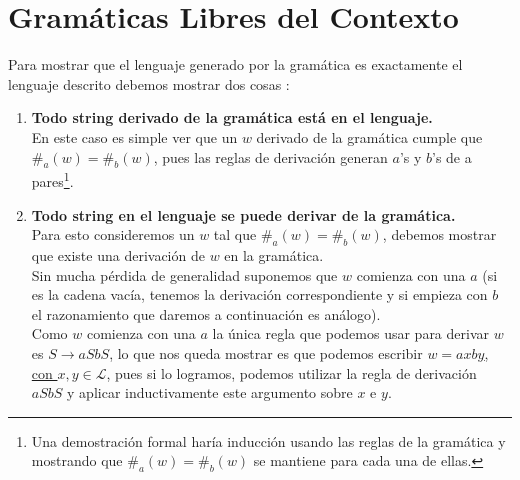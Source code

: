 \documentclass[dcc]{fcfmcourse}
\begin{document}
\section*{Gramáticas Libres del Contexto}
\begin{problems}
\problem
Para mostrar que el lenguaje generado por la gramática es exactamente  el lenguaje descrito debemos mostrar dos cosas :
\begin{enumerate}[1.]
\item \textbf{Todo string derivado de la gramática está en el lenguaje.}\\
En este caso es simple ver que un $w$ derivado de la gramática cumple que $\#_{a}(w)=\#_{b}(w)$, pues las reglas de derivación generan $a$'s y $b$'s de a pares\footnote{Una demostración formal haría inducción usando las reglas de la gramática y mostrando que $\#_{a}(w)=\#_{b}(w)$ se mantiene para cada una de ellas.}.
\item \textbf{Todo string en el lenguaje se puede derivar de la gramática.}\\
Para esto consideremos un $w$ tal que $\#_{a}(w)=\#_{b}(w)$, debemos mostrar que existe una derivación de $w$ en la gramática.\\

Sin mucha pérdida de generalidad suponemos que $w$ comienza con una $a$ (si es la cadena vacía, tenemos la derivación correspondiente y si empieza con $b$ el razonamiento que daremos a continuación es análogo).\\

Como $w$ comienza con una $a$ la única regla que podemos usar para derivar $w$ es $S \rightarrow  aSbS$, lo que nos queda mostrar es que podemos escribir \underline{$w = axby$, con $x, y \in \mathcal{L}$}, pues si lo logramos, podemos utilizar la regla de derivación $aSbS$ y aplicar inductivamente este argumento sobre $x$ e $y$.\\


\end{enumerate}
\end{problems}
\end{document}
